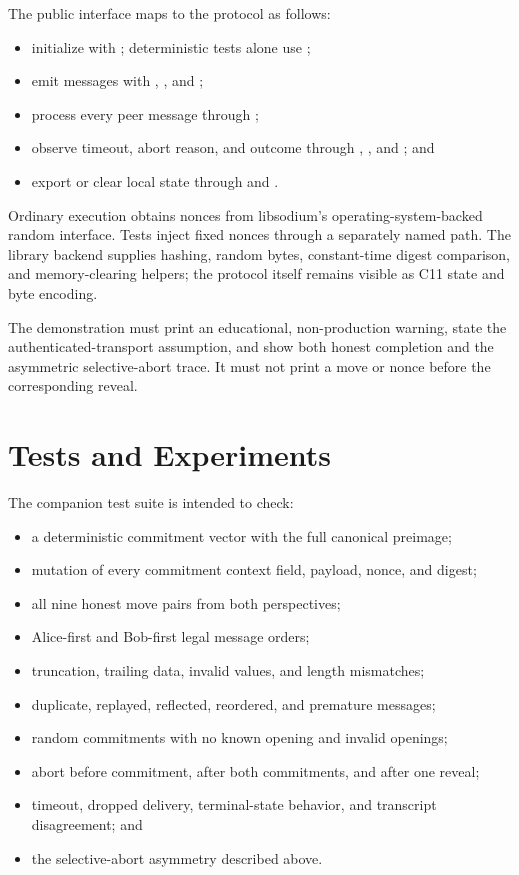 The public interface maps to the protocol as follows:

\begin{itemize}
    \item initialize with ; deterministic tests alone
    use ;
    \item emit messages with ,
    , and ;
    \item process every peer message through ;
    \item observe timeout, abort reason, and outcome through
    , , and
    ; and
    \item export or clear local state through 
    and .
\end{itemize}

Ordinary execution obtains nonces from libsodium's operating-system-backed
random interface. Tests inject fixed nonces through a separately named path.
The library backend supplies hashing, random bytes, constant-time digest
comparison, and memory-clearing helpers; the protocol itself remains visible
as C11 state and byte encoding.

The demonstration must print an educational, non-production warning, state the
authenticated-transport assumption, and show both honest completion and the
asymmetric selective-abort trace. It must not print a move or nonce before the
corresponding reveal.

\section{Tests and Experiments}

The companion test suite is intended to check:

\begin{itemize}
    \item a deterministic commitment vector with the full canonical preimage;
    \item mutation of every commitment context field, payload, nonce, and
    digest;
    \item all nine honest move pairs from both perspectives;
    \item Alice-first and Bob-first legal message orders;
    \item truncation, trailing data, invalid values, and length mismatches;
    \item duplicate, replayed, reflected, reordered, and premature messages;
    \item random commitments with no known opening and invalid openings;
    \item abort before commitment, after both commitments, and after one reveal;
    \item timeout, dropped delivery, terminal-state behavior, and transcript
    disagreement; and
    \item the selective-abort asymmetry described above.
\end{itemize}

